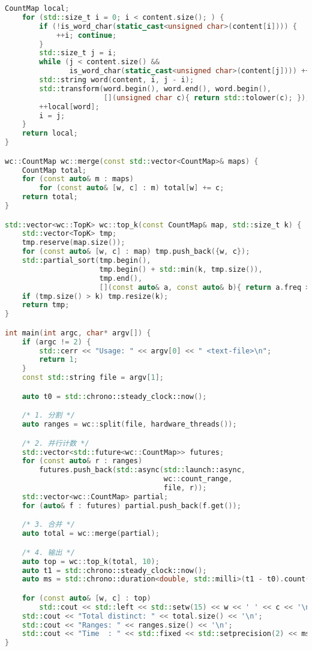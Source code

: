 \begin{lstlisting}[language=C++]
    CountMap local;
    for (std::size_t i = 0; i < content.size(); ) {
        if (!is_word_char(static_cast<unsigned char>(content[i]))) {
            ++i; continue;
        }
        std::size_t j = i;
        while (j < content.size() &&
               is_word_char(static_cast<unsigned char>(content[j]))) ++j;
        std::string word(content, i, j - i);
        std::transform(word.begin(), word.end(), word.begin(),
                       [](unsigned char c){ return std::tolower(c); });
        ++local[word];
        i = j;
    }
    return local;
}

wc::CountMap wc::merge(const std::vector<CountMap>& maps) {
    CountMap total;
    for (const auto& m : maps)
        for (const auto& [w, c] : m) total[w] += c;
    return total;
}

std::vector<wc::TopK> wc::top_k(const CountMap& map, std::size_t k) {
    std::vector<TopK> tmp;
    tmp.reserve(map.size());
    for (const auto& [w, c] : map) tmp.push_back({w, c});
    std::partial_sort(tmp.begin(),
                      tmp.begin() + std::min(k, tmp.size()),
                      tmp.end(),
                      [](const auto& a, const auto& b){ return a.freq > b.freq; });
    if (tmp.size() > k) tmp.resize(k);
    return tmp;
}

int main(int argc, char* argv[]) {
    if (argc != 2) {
        std::cerr << "Usage: " << argv[0] << " <text-file>\n";
        return 1;
    }
    const std::string file = argv[1];

    auto t0 = std::chrono::steady_clock::now();

    /* 1. 分割 */
    auto ranges = wc::split(file, hardware_threads());

    /* 2. 并行计数 */
    std::vector<std::future<wc::CountMap>> futures;
    for (const auto& r : ranges)
        futures.push_back(std::async(std::launch::async,
                                     wc::count_range,
                                     file, r));
    std::vector<wc::CountMap> partial;
    for (auto& f : futures) partial.push_back(f.get());

    /* 3. 合并 */
    auto total = wc::merge(partial);

    /* 4. 输出 */
    auto top = wc::top_k(total, 10);
    auto t1 = std::chrono::steady_clock::now();
    auto ms = std::chrono::duration<double, std::milli>(t1 - t0).count();

    for (const auto& [w, c] : top)
        std::cout << std::left << std::setw(15) << w << ' ' << c << '\n';
    std::cout << "Total distinct: " << total.size() << '\n';
    std::cout << "Ranges: " << ranges.size() << '\n';
    std::cout << "Time  : " << std::fixed << std::setprecision(2) << ms << " ms\n";
}
\end{lstlisting}

